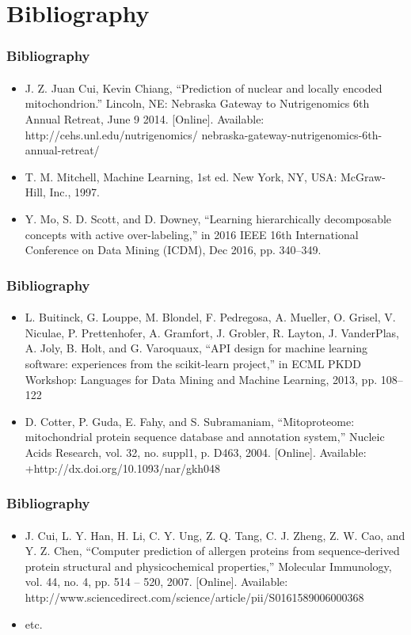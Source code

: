 \documentclass{beamer}
\begin{document}
\section{Bibliography}
\begin{frame}
    \frametitle{Bibliography}
    \framesubtitle{}
    \begin{itemize}
      \item J. Z. Juan Cui, Kevin Chiang, “Prediction of nuclear and locally encoded mitochondrion.” Lincoln, NE: Nebraska Gateway to Nutrigenomics 6th Annual Retreat, June 9 2014. [Online]. Available: http://cehs.unl.edu/nutrigenomics/ nebraska-gateway-nutrigenomics-6th-annual-retreat/
      \item T. M. Mitchell, Machine Learning, 1st ed. New York, NY, USA: McGraw-Hill, Inc., 1997.
      \item Y. Mo, S. D. Scott, and D. Downey, “Learning hierarchically decomposable concepts with active over-labeling,” in 2016 IEEE 16th International Conference on Data Mining (ICDM), Dec 2016, pp. 340–349.
    \end{itemize}
\end{frame}
\begin{frame}
    \frametitle{Bibliography}
    \framesubtitle{}
    \begin{itemize}
      \item L. Buitinck, G. Louppe, M. Blondel, F. Pedregosa, A. Mueller, O. Grisel, V. Niculae, P. Prettenhofer, A. Gramfort, J. Grobler, R. Layton, J. VanderPlas, A. Joly, B. Holt, and G. Varoquaux, “API design for machine learning software: experiences from the scikit-learn project,” in ECML PKDD Workshop: Languages for Data Mining and Machine Learning, 2013, pp. 108–122
      \item D. Cotter, P. Guda, E. Fahy, and S. Subramaniam, “Mitoproteome: mitochondrial protein sequence database and annotation system,” Nucleic Acids Research, vol. 32, no. suppl1, p. D463, 2004. [Online]. Available: +http://dx.doi.org/10.1093/nar/gkh048
    \end{itemize}
\end{frame}
\begin{frame}
    \frametitle{Bibliography}
    \framesubtitle{}
    \begin{itemize}
      \item J. Cui, L. Y. Han, H. Li, C. Y. Ung, Z. Q. Tang, C. J. Zheng, Z. W. Cao, and Y. Z. Chen, “Computer prediction of allergen proteins from sequence-derived protein structural and physicochemical properties,” Molecular Immunology, vol. 44, no. 4, pp. 514 – 520, 2007. [Online]. Available: http://www.sciencedirect.com/science/article/pii/S0161589006000368
      \item etc.
    \end{itemize}
\end{frame}
\end{document}
